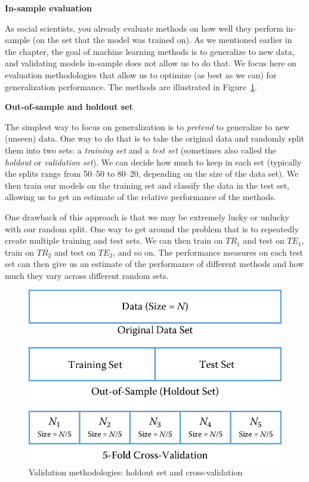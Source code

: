 \documentclass[]{krantz}
\begin{document}
\textbf{In-sample evaluation}

As social scientists, you already evaluate methods on how well they
perform in-sample (on the set that the model was trained on). As we
mentioned earlier in the chapter, the goal of machine learning methods
is to generalize to new data, and validating models in-sample does not
allow us to do that. We focus here on evaluation methodologies that
allow us to optimize (as best as we can) for generalization performance.
The methods are illustrated in Figure~\ref{fig:holdout}.

\textbf{Out-of-sample and holdout set}

The simplest way to focus on generalization is to \emph{pretend} to
generalize to new (unseen) data. One way to do that is to take the
original data and randomly split them into two sets: a \emph{training
set} and a \emph{test set} (sometimes also called the \emph{holdout} or
\emph{validation set}). We can decide how much to keep in each set
(typically the splits range from 50--50 to 80--20, depending on the size
of the data set). We then train our models on the training set and
classify the data in the test set, allowing us to get an estimate of the
relative performance of the methods.

One drawback of this approach is that we may be extremely lucky or
unlucky with our random split. One way to get around the problem that is
to repeatedly create multiple training and test sets. We can then train
on \(TR_1\) and test on \(TE_1\), train on \(TR_2\) and test on
\(TE_2\), and so on. The performance measures on each test set can then
give us an estimate of the performance of different methods and how much
they vary across different random sets.

\begin{figure}

{\centering \includegraphics[width=0.7\linewidth]{ChapterML/figures/holdout} 

}

\caption{Validation methodologies: holdout set and cross-validation}\label{fig:holdout}
\end{figure}
\end{document}
